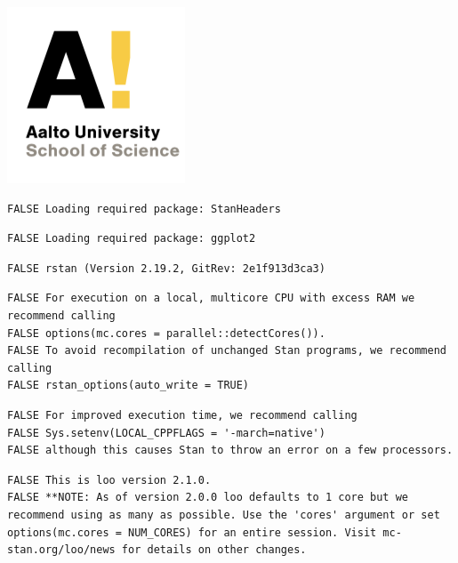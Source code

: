 \documentclass[]{article}
\title{}
\author{}
\date{}
\begin{document}
{
\setcounter{tocdepth}{1}
\tableofcontents
}
\begin{center}\includegraphics[width=0.6\linewidth]{aalto} \end{center}

\begin{verbatim}
FALSE Loading required package: StanHeaders
\end{verbatim}

\begin{verbatim}
FALSE Loading required package: ggplot2
\end{verbatim}

\begin{verbatim}
FALSE rstan (Version 2.19.2, GitRev: 2e1f913d3ca3)
\end{verbatim}

\begin{verbatim}
FALSE For execution on a local, multicore CPU with excess RAM we recommend calling
FALSE options(mc.cores = parallel::detectCores()).
FALSE To avoid recompilation of unchanged Stan programs, we recommend calling
FALSE rstan_options(auto_write = TRUE)
\end{verbatim}

\begin{verbatim}
FALSE For improved execution time, we recommend calling
FALSE Sys.setenv(LOCAL_CPPFLAGS = '-march=native')
FALSE although this causes Stan to throw an error on a few processors.
\end{verbatim}

\begin{verbatim}
FALSE This is loo version 2.1.0.
FALSE **NOTE: As of version 2.0.0 loo defaults to 1 core but we recommend using as many as possible. Use the 'cores' argument or set options(mc.cores = NUM_CORES) for an entire session. Visit mc-stan.org/loo/news for details on other changes.
\end{verbatim}
\end{document}
